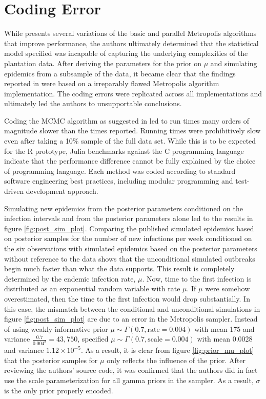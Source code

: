 \documentclass{uwstat572}
\begin{document}
\newpage
\section{Coding Error}
\label{coding_error}

While \citet{Brown} presents several variations of the basic and parallel Metropolis algorithms that improve performance, the authors ultimately determined that the statistical model specified was incapable of capturing the underlying complexities of the plantation data. 
After deriving the parameters for the prior on $\mu$ and simulating epidemics from a subsample of the data, it became clear that the findings reported in \citet{Brown} were based on a irreparably flawed Metropolis algorithm implementation. 
The coding errors were replicated across all implementations and ultimately led the authors to unsupportable conclusions.

Coding the MCMC algorithm as suggested in \citet{Brown} led to run times many orders of magnitude slower than the times reported. 
Running times were prohibitively slow even after taking a 10\% sample of the full data set. 
While this is to be expected for the R prototype, Julia benchmarks against the C programming language indicate that the performance difference cannot be fully explained by the choice of programming language. 
Each method was coded according to standard software engineering best practices, including modular programming and test-driven development approach.  

Simulating new epidemics from the posterior parameters conditioned on the infection intervals and from the posterior parameters alone led \citet{Brown} to the results in figure \ref{fig:post_sim_plot}. 
Comparing the published simulated epidemics based on posterior samples for the number of new infections per week conditioned on the six observations with simulated epidemics based on the posterior parameters without reference to the data shows that the unconditional simulated outbreaks begin much faster than what the data supports. 
This result is completely determined by the endemic infection rate, $\mu$. 
Now, time to the first infection is distributed as an exponential random variable with rate $\mu$. 
If $\mu$ were somehow overestimated, then the time to the first infection would drop substantially.
In this case, the mismatch between the conditional and unconditional simulations in figure \ref{fig:post_sim_plot} are due to an error in the Metropolis sampler. 
Instead of using weakly informative prior $\mu \sim \Gamma(0.7, \text{rate}=0.004)$ with mean 175 and variance $\frac{0.7}{0.004^2}=43,750$, \citep{Brown} specified $\mu \sim \Gamma(0.7, \text{scale}=0.004)$ with mean 0.0028 and variance $1.12\times10^{-5}$. 
As a result, it is clear from figure \ref{fig:prior_mu_plot} that the posterior samples for $\mu$ only reflects the influence of the prior. 
After reviewing the authors' source code, it was confirmed that the authors did in fact use the scale parameterization for all gamma priors in the sampler. 
As a result, $\sigma$ is the only prior properly encoded. 
\end{document}
